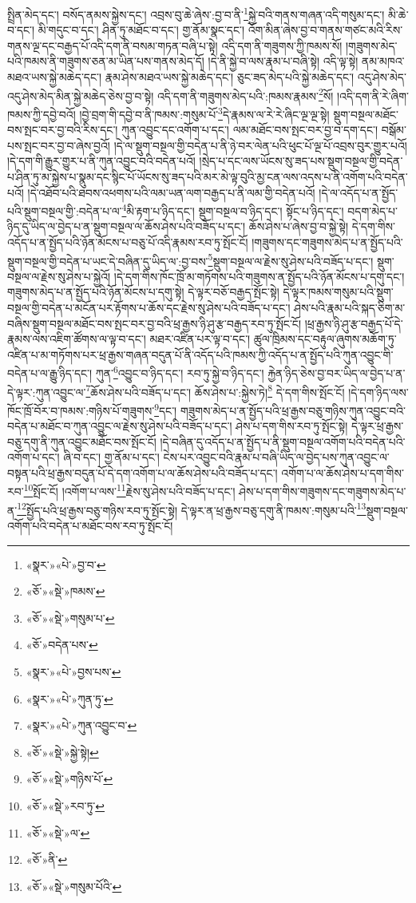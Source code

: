 སྤྲིན་མེད་དང་། བསོད་ནམས་སྐྱེས་དང་། འབྲས་བུ་ཆེ་ཞེས་:བྱ་བ་ནི་\footnote{«སྣར་»«པེ་»བྱ་བ་}སྐྱེ་བའི་གནས་གཞན་འདི་གསུམ་དང་། མི་ཆེ་བ་དང་། མི་གདུང་བ་དང་། ཤིན་ཏུ་མཐོང་བ་དང་། གྱ་ནོམ་སྣང་དང་། འོག་མིན་ཞེས་བྱ་བ་གནས་གཙང་མའི་རིས་གནས་ལྔ་དང་བརྒྱད་པོ་འདི་དག་ནི་བསམ་གཏན་བཞི་པ་སྟེ། འདི་དག་ནི་གཟུགས་ཀྱི་ཁམས་སོ། །གཟུགས་མེད་པའི་ཁམས་ནི་གཟུགས་ཅན་མ་ཡིན་པས་གནས་མེད་དོ། །དེ་ནི་སྐྱེ་བ་ལས་རྣམ་པ་བཞི་སྟེ། འདི་ལྟ་སྟེ། ནམ་མཁའ་མཐའ་ཡས་སྐྱེ་མཆེད་དང་། རྣམ་ཤེས་མཐའ་ཡས་སྐྱེ་མཆེད་དང་། ཅུང་ཟད་མེད་པའི་སྐྱེ་མཆེད་དང་། འདུ་ཤེས་མེད་འདུ་ཤེས་མེད་མིན་སྐྱེ་མཆེད་ཅེས་བྱ་བ་སྟེ། འདི་དག་ནི་གཟུགས་མེད་པའི་:ཁམས་རྣམས་\footnote{«ཅོ་»«སྡེ་»ཁམས་}སོ། །འདི་དག་ནི་རེ་ཞིག་ཁམས་ཀྱི་དབྱེ་བའོ། །བྱེ་བྲག་གི་དབྱེ་བ་ནི་ཁམས་:གསུམ་པོ་\footnote{«ཅོ་»«སྡེ་»གསུམ་པ་}དེ་རྣམས་ལ་རེ་རེ་ཞིང་ལྔ་ལྔ་སྟེ། སྡུག་བསྔལ་མཐོང་བས་སྤང་བར་བྱ་བའི་རིས་དང་། ཀུན་འབྱུང་དང་འགོག་པ་དང་། ལམ་མཐོང་བས་སྤང་བར་བྱ་བ་དག་དང་། བསྒོམ་པས་སྤང་བར་བྱ་བ་ཞེས་བྱའོ། །དེ་ལ་སྡུག་བསྔལ་གྱི་བདེན་པ་ནི་ཉེ་བར་ལེན་པའི་ཕུང་པོ་ལྔ་པོ་འབྲས་བུར་གྱུར་པའོ། །དེ་དག་གི་རྒྱུར་གྱུར་པ་ནི་ཀུན་འབྱུང་བའི་བདེན་པའོ། །སྲེད་པ་དང་ལས་ཡོངས་སུ་ཟད་པས་སྡུག་བསྔལ་གྱི་བདེན་པ་ཤིན་ཏུ་མ་སྐྱེས་པ་སྣུམ་དང་སྙིང་པོ་ཡོངས་སུ་ཟད་པའི་མར་མེ་ལྟ་བུའི་མྱ་ངན་ལས་འདས་པ་ནི་འགོག་པའི་བདེན་པའོ། །དེ་འཐོབ་པའི་ཐབས་འཕགས་པའི་ལམ་ཡན་ལག་བརྒྱད་པ་ནི་ལམ་གྱི་བདེན་པའོ། །དེ་ལ་འདོད་པ་ན་སྤྱོད་པའི་སྡུག་བསྔལ་གྱི་:བདེན་པ་ལ་\footnote{«ཅོ་»བདེན་པས་}མི་རྟག་པ་ཉིད་དང་། སྡུག་བསྔལ་བ་ཉིད་དང་། སྟོང་པ་ཉིད་དང་། བདག་མེད་པ་ཉིད་དུ་ཡིད་ལ་བྱེད་པ་ན་སྡུག་བསྔལ་ལ་ཆོས་ཤེས་པའི་བཟོད་པ་དང་། ཆོས་ཤེས་པ་ཞེས་བྱ་བ་སྐྱེ་སྟེ། དེ་དག་གིས་འདོད་པ་ན་སྤྱོད་པའི་ཉོན་མོངས་པ་བཅུ་པོ་འདི་རྣམས་རབ་ཏུ་སྤོང་ངོ། །གཟུགས་དང་གཟུགས་མེད་པ་ན་སྤྱོད་པའི་སྡུག་བསྔལ་གྱི་བདེན་པ་ཡང་དེ་བཞིན་དུ་ཡིད་ལ་:བྱ་བས་\footnote{«སྣར་»«པེ་»བྱས་པས་}སྡུག་བསྔལ་ལ་རྗེས་སུ་ཤེས་པའི་བཟོད་པ་དང་། སྡུག་བསྔལ་ལ་རྗེས་སུ་ཤེས་པ་སྐྱེའོ། །དེ་དག་གིས་ཁོང་ཁྲོ་མ་གཏོགས་པའི་གཟུགས་ན་སྤྱོད་པའི་ཉོན་མོངས་པ་དགུ་དང་། གཟུགས་མེད་པ་ན་སྤྱོད་པའི་ཉོན་མོངས་པ་དགུ་སྟེ། དེ་ལྟར་བཅོ་བརྒྱད་སྤོང་སྟེ། དེ་ལྟར་ཁམས་གསུམ་པའི་སྡུག་བསྔལ་གྱི་བདེན་པ་མངོན་པར་རྟོགས་པ་ཆོས་དང་རྗེས་སུ་ཤེས་པའི་བཟོད་པ་དང་། ཤེས་པའི་རྣམ་པའི་སྐད་ཅིག་མ་བཞིས་སྡུག་བསྔལ་མཐོང་བས་སྤང་བར་བྱ་བའི་ཕྲ་རྒྱས་ཉི་ཤུ་རྩ་བརྒྱད་རབ་ཏུ་སྤོང་ངོ། །ཕྲ་རྒྱས་ཉི་ཤུ་རྩ་བརྒྱད་པོ་དེ་རྣམས་ལས་འཇིག་ཚོགས་ལ་ལྟ་བ་དང་། མཐར་འཛིན་པར་ལྟ་བ་དང་། ཚུལ་ཁྲིམས་དང་བརྟུལ་ཞུགས་མཆོག་ཏུ་འཛིན་པ་མ་གཏོགས་པར་ཕྲ་རྒྱས་གཞན་བདུན་པོ་ནི་འདོད་པའི་ཁམས་ཀྱི་འདོད་པ་ན་སྤྱོད་པའི་ཀུན་འབྱུང་གི་བདེན་པ་ལ་རྒྱུ་ཉིད་དང་། ཀུན་\footnote{«སྣར་»«པེ་»ཀུན་ཏུ་}འབྱུང་བ་ཉིད་དང་། རབ་ཏུ་སྐྱེ་བ་ཉིད་དང་། རྐྱེན་ཉིད་ཅེས་བྱ་བར་ཡིད་ལ་བྱེད་པ་ན་དེ་ལྟར་:ཀུན་འབྱུང་ལ་\footnote{«སྣར་»«པེ་»ཀུན་འབྱུང་བ་}ཆོས་ཤེས་པའི་བཟོད་པ་དང་། ཆོས་ཤེས་པ་:སྐྱེས་ཏེ།\footnote{«ཅོ་»«སྡེ་»སྐྱེ་སྟེ།} དེ་དག་གིས་སྤོང་ངོ། །དེ་དག་ཉིད་ལས་ཁོང་ཁྲོ་བོར་བ་ཁམས་:གཉིས་པོ་གཟུགས་\footnote{«ཅོ་»«སྡེ་»གཉིས་པོ་}དང་། གཟུགས་མེད་པ་ན་སྤྱོད་པའི་ཕྲ་རྒྱས་བཅུ་གཉིས་ཀུན་འབྱུང་བའི་བདེན་པ་མཐོང་བ་ཀུན་འབྱུང་ལ་རྗེས་སུ་ཤེས་པའི་བཟོད་པ་དང་། ཤེས་པ་དག་གིས་རབ་ཏུ་སྤོང་སྟེ། དེ་ལྟར་ཕྲ་རྒྱས་བཅུ་དགུ་ནི་ཀུན་འབྱུང་མཐོང་བས་སྤོང་ངོ། །དེ་བཞིན་དུ་འདོད་པ་ན་སྤྱོད་པ་ནི་སྡུག་བསྔལ་འགོག་པའི་བདེན་པའི་འགོག་པ་དང་། ཞི་བ་དང་། གྱ་ནོམ་པ་དང་། ངེས་པར་འབྱུང་བའི་རྣམ་པ་བཞི་ཡིད་ལ་བྱེད་པས་ཀུན་འབྱུང་ལ་བསྟན་པའི་ཕྲ་རྒྱས་བདུན་པོ་དེ་དག་འགོག་པ་ལ་ཆོས་ཤེས་པའི་བཟོད་པ་དང་། འགོག་པ་ལ་ཆོས་ཤེས་པ་དག་གིས་རབ་\footnote{«ཅོ་»«སྡེ་»རབ་ཏུ་}སྤོང་ངོ། །འགོག་པ་ལས་\footnote{«ཅོ་»«སྡེ་»ལ་}རྗེས་སུ་ཤེས་པའི་བཟོད་པ་དང་། ཤེས་པ་དག་གིས་གཟུགས་དང་གཟུགས་མེད་པ་ན་\footnote{«ཅོ་»ནི་}སྤྱོད་པའི་ཕྲ་རྒྱས་བཅུ་གཉིས་རབ་ཏུ་སྤོང་སྟེ། དེ་ལྟར་ན་ཕྲ་རྒྱས་བཅུ་དགུ་ནི་ཁམས་:གསུམ་པའི་\footnote{«ཅོ་»«སྡེ་»གསུམ་པོའི་}སྡུག་བསྔལ་འགོག་པའི་བདེན་པ་མཐོང་བས་རབ་ཏུ་སྤོང་ངོ། 